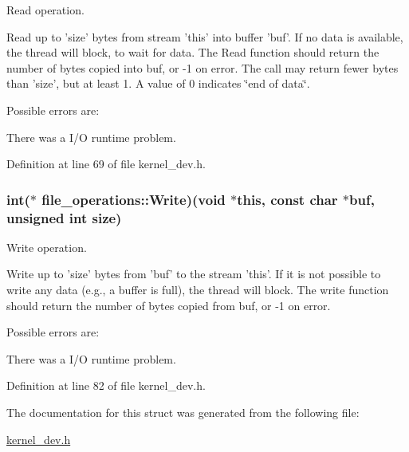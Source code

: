 Read operation. 

Read up to 'size' bytes from stream 'this' into buffer 'buf'. If no data is available, the thread will block, to wait for data. The Read function should return the number of bytes copied into buf, or -\/1 on error. The call may return fewer bytes than 'size', but at least 1. A value of 0 indicates \char`\"{}end of data\char`\"{}.

Possible errors are\-:
\begin{DoxyItemize}
\item There was a I/\-O runtime problem. 
\end{DoxyItemize}

Definition at line 69 of file kernel\-\_\-dev.\-h.

\hypertarget{structfile__operations_a18e4e521277501fe34c95a3e2a4ef4d5}{
\subsubsection[{Write}]{\setlength{\rightskip}{0pt plus 5cm}int($\ast$ file\-\_\-operations\-::\-Write)(void $\ast$this, const char $\ast$buf, unsigned int size)}}\label{structfile__operations_a18e4e521277501fe34c95a3e2a4ef4d5}


Write operation. 

Write up to 'size' bytes from 'buf' to the stream 'this'. If it is not possible to write any data (e.\-g., a buffer is full), the thread will block. The write function should return the number of bytes copied from buf, or -\/1 on error.

Possible errors are\-:
\begin{DoxyItemize}
\item There was a I/\-O runtime problem. 
\end{DoxyItemize}

Definition at line 82 of file kernel\-\_\-dev.\-h.



The documentation for this struct was generated from the following file\-:\begin{DoxyCompactItemize}
\item 
\hyperlink{kernel__dev_8h}{kernel\-\_\-dev.\-h}\end{DoxyCompactItemize}
